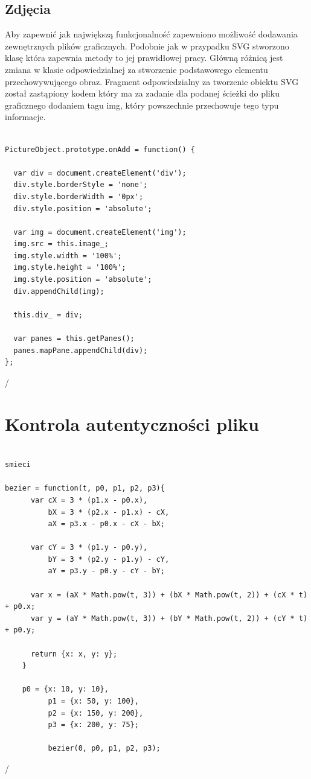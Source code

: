 \subsection{Zdjęcia}
\label{subsec:pictures}

Aby zapewnić jak największą funkcjonalność zapewniono możliwość dodawania zewnętrznych plików graficznych.
Podobnie jak w przypadku SVG stworzono klasę która zapewnia metody to jej prawidłowej pracy. Główną różnicą jest zmiana w klasie odpowiedzialnej za stworzenie podstawowego elementu przechowywującego obraz. Fragment odpowiedzialny za tworzenie obiektu SVG został zastąpiony kodem który ma za zadanie dla podanej ścieżki do pliku graficznego dodaniem tagu img, który powszechnie przechowuje tego typu informacje.

\lstset{language=JavaScript}
\begin{lstlisting}[label={lst:svgImpl},caption={Klasa do obsługi SVG}]

PictureObject.prototype.onAdd = function() {

  var div = document.createElement('div');
  div.style.borderStyle = 'none';
  div.style.borderWidth = '0px';
  div.style.position = 'absolute';

  var img = document.createElement('img');
  img.src = this.image_;
  img.style.width = '100%';
  img.style.height = '100%';
  img.style.position = 'absolute';
  div.appendChild(img);

  this.div_ = div;

  var panes = this.getPanes();
  panes.mapPane.appendChild(div);
};

\end{lstlisting}/


\section{Kontrola autentyczności pliku}
\label{sec:walidacjaPliku}

\lstset{language=JavaScript}
\begin{lstlisting}[label={lst:aproks},caption={Aproksymacja danych}]

smieci

bezier = function(t, p0, p1, p2, p3){
      var cX = 3 * (p1.x - p0.x),
          bX = 3 * (p2.x - p1.x) - cX,
          aX = p3.x - p0.x - cX - bX;

      var cY = 3 * (p1.y - p0.y),
          bY = 3 * (p2.y - p1.y) - cY,
          aY = p3.y - p0.y - cY - bY;

      var x = (aX * Math.pow(t, 3)) + (bX * Math.pow(t, 2)) + (cX * t) + p0.x;
      var y = (aY * Math.pow(t, 3)) + (bY * Math.pow(t, 2)) + (cY * t) + p0.y;

      return {x: x, y: y};
    }
    
    p0 = {x: 10, y: 10},
          p1 = {x: 50, y: 100},
          p2 = {x: 150, y: 200},
          p3 = {x: 200, y: 75};
          
          bezier(0, p0, p1, p2, p3);

\end{lstlisting}/

